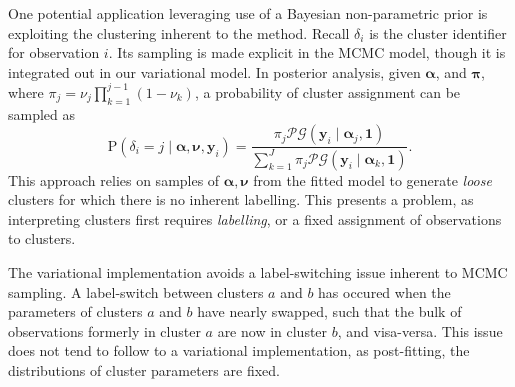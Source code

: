 \begin{comment}
    \begin{itemize}
        \item Description of storm parameter clustering problem
        \item Introduction of variational inference
        \begin{itemize}
            \item Describe variational distribution
            \item Necessity (only model using t90 dataset)
            \item Relative performance (computational speed)
        \end{itemize}
        \item Describe clustering methodology
        \item Emergent clusters from both t90 and all--but--road--features in input space.
        \item What does this mean?
    \end{itemize}
\end{comment}

One potential application leveraging use of a Bayesian non-parametric prior is 
    exploiting the clustering inherent to the method. Recall $\delta_i$ is the 
    cluster identifier for observation $i$.  Its sampling is made explicit in
    the MCMC model, though it is integrated out in our variational model. In
    posterior analysis, given $\bm{\alpha}$, and $\bm{\pi}$, where 
    $\pi_j = \nu_j\prod_{k = 1}^{j-1}(1 - \nu_k)$, a probability of cluster 
    assignment can be sampled as
    \begin{equation}
        \label{eqn:clusterprob}
        \text{P}\left(\delta_i = j\mid\bm{\alpha},\bm{\nu},\bm{y}_i\right) 
            = \frac{\pi_j\mathcal{PG}(\bm{y}_i\mid\bm{\alpha}_j,\bm{1})}{
            \sum_{k = 1}^J \pi_j\mathcal{PG}(\bm{y}_i\mid\bm{\alpha}_k,\bm{1})}.
    \end{equation}
    This approach relies on samples of $\bm{\alpha},\bm{\nu}$ from the fitted
    model to generate \emph{loose} clusters for which there is no inherent 
    labelling.  This presents a problem, as interpreting clusters first requires
    \emph{labelling}, or a fixed assignment of observations to clusters.

The variational implementation avoids a label-switching issue inherent to 
    MCMC sampling.  A label-switch between clusters $a$ and $b$ has occured when
    the parameters of clusters $a$ and $b$ have nearly swapped, such that the
    bulk of observations formerly in cluster $a$ are now in cluster $b$, and 
    visa-versa.  This issue does not tend to follow to a variational 
    implementation, as post-fitting, the distributions of cluster parameters are 
    fixed.

